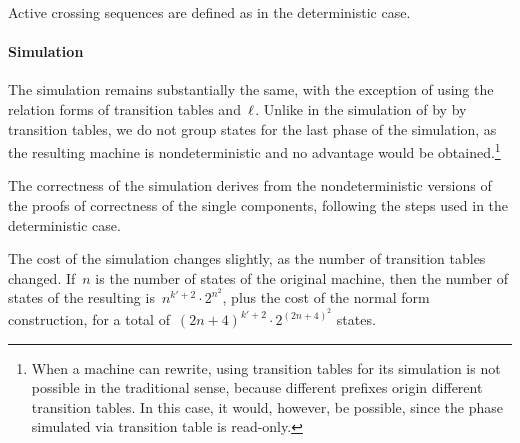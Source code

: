 Active crossing sequences are defined as in the deterministic case.

\paragraph{Simulation} The simulation remains substantially the same, with the exception of using the relation forms of transition tables and~$\ell$.
Unlike in the simulation of \TNFAs by \ODFAs by transition tables, we do not group states for the last phase of the simulation, as the resulting machine is nondeterministic and no advantage would be obtained.\footnote{%
	When a machine can rewrite, using transition tables for its simulation is not possible in the traditional sense, because different prefixes origin different transition tables.
	In this case, it would, however, be possible, since the phase simulated via transition table is read-only.}

The correctness of the simulation derives from the nondeterministic versions of the proofs of correctness of the single components, following the steps used in the deterministic case.

The cost of the simulation changes slightly, as the number of transition tables changed.
If~$n$ is the number of states of the original machine, then the number of states of the resulting \ONFAs is~$n^{k'+2}\cdot2^{n^2}$, plus the cost of the normal form construction, for a total of~$(2n+4)^{k'+2}\cdot2^{(2n+4)^2}$ states.
